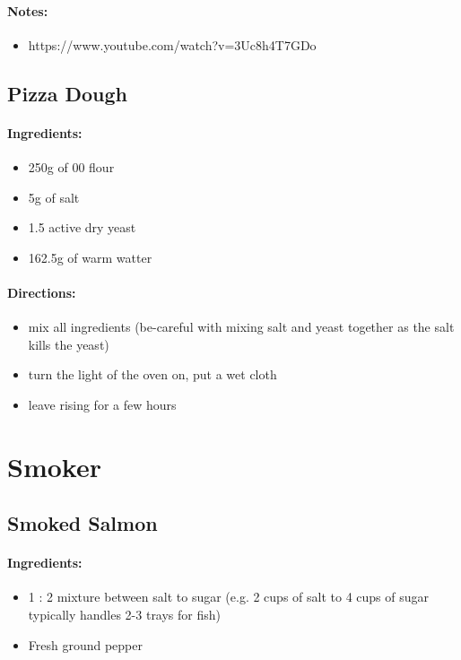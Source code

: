 \documentclass{article}
\begin{document}
\paragraph{Notes:}
\begin{itemize}
    \item https://www.youtube.com/watch?v=3Uc8h4T7GDo
\end{itemize}

\subsection{Pizza Dough}

\paragraph{Ingredients:}
\begin{itemize}
    \item 250g of 00 flour
    \item 5g of salt
    \item 1.5 active dry yeast
    \item 162.5g of warm watter
\end{itemize}

\paragraph{Directions:}
\begin{itemize}
    \item mix all ingredients (be-careful with mixing salt and yeast together as the salt kills the yeast)
    \item turn the light of the oven on, put a wet cloth
    \item leave rising for a few hours
\end{itemize}

\section{Smoker}


\subsection{Smoked Salmon}

\paragraph{Ingredients:}
\begin{itemize}
    \item 1 : 2 mixture between salt to sugar (e.g. 2 cups of salt to 4 cups of sugar typically handles 2-3 trays for fish)
    \item Fresh ground pepper
\end{itemize}
\end{document}
